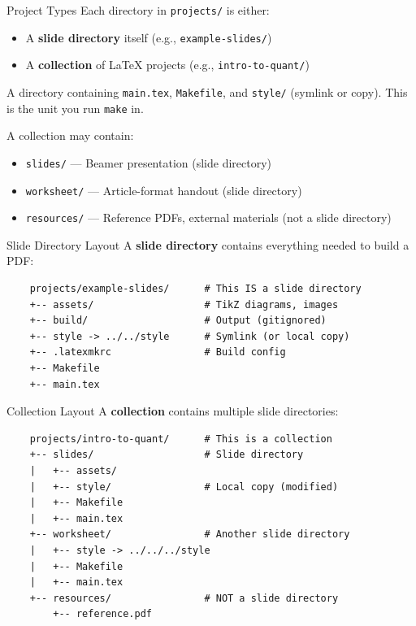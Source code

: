 \begin{frame}{Project Types}
  Each directory in \texttt{projects/} is either:
  \begin{itemize}
    \item A \textbf{slide directory} itself (e.g., \texttt{example-slides/})
    \item A \textbf{collection} of LaTeX projects (e.g., \texttt{intro-to-quant/})
  \end{itemize}

  \vspace{0.3cm}
  \begin{sqt:definition}
    A directory containing \texttt{main.tex}, \texttt{Makefile}, and \texttt{style/} (symlink or copy).
    This is the unit you run \texttt{make} in.
  \end{sqt:definition}

  \vspace{0.3cm}
  A collection may contain:
  \begin{itemize}
    \item \texttt{slides/} --- Beamer presentation (slide directory)
    \item \texttt{worksheet/} --- Article-format handout (slide directory)
    \item \texttt{resources/} --- Reference PDFs, external materials (not a slide directory)
  \end{itemize}
\end{frame}

\begin{frame}[fragile]{Slide Directory Layout}
  A \textbf{slide directory} contains everything needed to build a PDF:
  \begin{verbatim}
    projects/example-slides/      # This IS a slide directory
    +-- assets/                   # TikZ diagrams, images
    +-- build/                    # Output (gitignored)
    +-- style -> ../../style      # Symlink (or local copy)
    +-- .latexmkrc                # Build config
    +-- Makefile
    +-- main.tex
  \end{verbatim}
\end{frame}

\begin{frame}[fragile]{Collection Layout}
  A \textbf{collection} contains multiple slide directories:
  \begin{verbatim}
    projects/intro-to-quant/      # This is a collection
    +-- slides/                   # Slide directory
    |   +-- assets/
    |   +-- style/                # Local copy (modified)
    |   +-- Makefile
    |   +-- main.tex
    +-- worksheet/                # Another slide directory
    |   +-- style -> ../../../style
    |   +-- Makefile
    |   +-- main.tex
    +-- resources/                # NOT a slide directory
        +-- reference.pdf
  \end{verbatim}
\end{frame}

